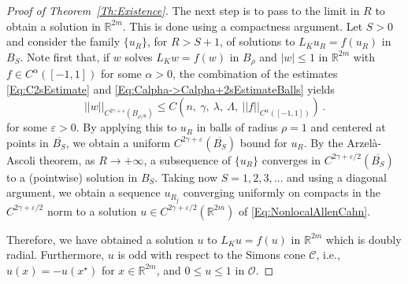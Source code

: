 \documentclass[12pt,reqno]{amsart}
\theoremstyle{definition}
\theoremstyle{remark}
\newcommand{\con}[1]{\mathbb{#1}}
\newcommand{\R}{\con{R}} %
\newcommand{\ccal}{\mathscr{C}}
\newcommand{\ocal}{\mathcal{O}}
\newcommand{\norm}[1]{\left | \left |{#1} \right | \right |}
\newcommand{\s}{\gamma}
\newcommand{\bpar}[1]{\left ( {#1}\right )}
\numberwithin{equation}{section}
\begin{document}
\begin{proof}[Proof of Theorem~\ref{Th:Existence}]
	The next step is to pass to the limit in $R$ to obtain a solution in $\R^{2m}$. This is done using a compactness argument. Let $S>0$ and consider the family $\{u_R\}$, for $R> S + 1$, of solutions to $L_K u_R = f(u_R)$ in $B_{S}$. Note first that, if $w$ solves $L_K w = f(w)$ in $B_\rho$ and  $|w|\leq 1$ in $\R^{2m}$ with $f\in C^{\alpha}([-1,1])$ for some $\alpha > 0$, the combination of the estimates \eqref{Eq:C2sEstimate} and \eqref{Eq:Calpha->Calpha+2sEstimateBalls} yields
	$$
	\norm{w}_{C^{2\s + \varepsilon}(B_{\rho/8})} \leq C \bpar{n,\ \s ,\ \lambda,\ \Lambda ,\ \norm{f}_{C^{\alpha}([-1,1])} }\,.
	$$
	for some $\varepsilon > 0$.  By applying this to $u_R$ in balls of radius $\rho = 1$ and centered at points in $\overline{B_{S}}$, we obtain a uniform $C^{2\s + \varepsilon}(\overline{B_S})$ bound for $u_R$. By the Arzelà-Ascoli theorem, as $R\to +\infty$, a subsequence of $\{u_R\}$ converges in $C^{2\s + \varepsilon/2}(\overline{B_S})$ to a (pointwise) solution in $B_S$. Taking now $S = 1,2,3,\ldots$ and using a diagonal argument, we obtain a sequence $u_{R_j}$ converging uniformly on compacts in the $C^{2\s + \varepsilon/2}$ norm to a solution $u \in C^{2\s + \varepsilon/2}(\R^{2m})$ of \eqref{Eq:NonlocalAllenCahn}.
	
	Therefore, we have obtained a solution $u$ to $L_K u = f(u)$ in $\R^{2m}$ which is doubly radial. Furthermore, $u$ is odd with respect to the Simons cone $\ccal$, i.e., $u(x) = -u(x^\star)$ for $x\in \R^{2m}$, and $0 \leq u\leq 1$ in $\ocal$.
	

\end{proof}
\end{document}
